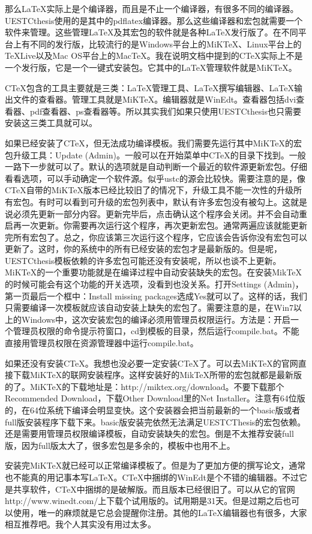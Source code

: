  那么LaTeX实际上是个编译器，而且是不止一个编译器，有很多不同的编译器。UESTCthesis使用的是其中的pdflatex编译器。那么这些编译器和宏包就需要一个软件来管理。这些管理LaTeX及其宏包的软件就是各种LaTeX发行版了。在不同平台上有不同的发行版，比较流行的是Windows平台上的MiKTeX、Linux平台上的TeXLive以及Mac OS平台上的MacTeX。我在说明文档中提到的CTeX实际上不是一个发行版，它是一个一键式安装包。它其中的LaTeX管理软件就是MiKTeX。

 CTeX包含的工具主要就是三类：LaTeX管理工具、LaTeX撰写编辑器、LaTeX输出文件的查看器。管理工具就是MiKTeX。编辑器就是WinEdt。查看器包括dvi查看器、pdf查看器、ps查看器等。所以其实我们如果只使用UESTCthesis也只需要安装这三类工具就可以。

如果已经安装了CTeX，但无法成功编译模板。我们需要先运行其中MiKTeX的宏包升级工具：Update (Admin)。一般可以在开始菜单中CTeX的目录下找到。一般一路下一步就可以了。默认的选项就是自动判断一个最近的软件源更新宏包。仔细看看选项，可以手动确定一个软件源。似乎ustc的源会比较快。需要注意的是，像CTeX自带的MiKTeX版本已经比较旧了的情况下，升级工具不能一次性的升级所有宏包。有时可以看到可升级的宏包列表中，默认有许多宏包没有被勾上。这就是说必须先更新一部分内容。更新完毕后，点击确认这个程序会关闭。并不会自动重启再一次更新。你需要再次运行这个程序，再次更新宏包。通常两遍应该就能更新完所有宏包了。总之，你应该第三次运行这个程序，它应该会告诉你没有宏包可以更新了。这时，你的系统中的所有已经安装的宏包才是最新版的。但是呢，UESTCthesis模板依赖的许多宏包可能还没有安装呢，所以也谈不上更新。MiKTeX的一个重要功能就是在编译过程中自动安装缺失的宏包。在安装MikTeX的时候可能会有这个功能的开关选项，没看到也没关系。打开Settings (Admin)，第一页最后一个框中：Install missing packages选成Yes就可以了。这样的话，我们只需要编译一次模板就应该自动安装上缺失的宏包了。需要注意的是，在Win7以上的Windows中，这次安装宏包的编译必须用管理员权限运行。方法是：开启一个管理员权限的命令提示符窗口，cd到模板的目录，然后运行compile.bat。不能直接用管理员权限在资源管理器中运行compile.bat。

 如果还没有安装CTeX。我想也没必要一定安装CTeX了。可以去MiKTeX的官网直接下载MiKTeX的联网安装程序。这样安装好的MikTeX所带的宏包就都是最新版的了。MiKTeX的下载地址是：http://miktex.org/download。不要下载那个Recommended Download，下载Other Download里的Net Installer。注意有64位版的，在64位系统下编译会明显变快。这个安装器会把当前最新的一个basic版或者full版安装程序下载下来。basic版安装完依然无法满足UESTCThesis的宏包依赖。还是需要用管理员权限编译模板，自动安装缺失的宏包。倒是不太推荐安装full版，因为full版太大了，很多宏包是多余的，模板中也用不上。

 安装完MiKTeX就已经可以正常编译模板了。但是为了更加方便的撰写论文，通常也不能真的用记事本写LaTeX。CTeX中捆绑的WinEdt是个不错的编辑器。不过它是共享软件，CTeX中捆绑的是破解版。而且版本已经很旧了。可以从它的官网http://www.winedt.com/上下载个试用版的。试用期是31天。但是过期之后也可以使用，唯一的麻烦就是它总会提醒你注册。其他的LaTeX编辑器也有很多，大家相互推荐吧。我个人其实没有用过太多。

